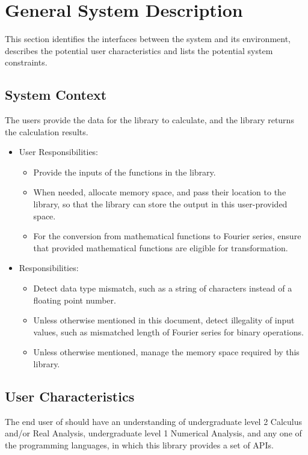 \documentclass[12pt]{article}
\begin{document}
\section{General System Description}

This section identifies the interfaces between the system and its environment,
describes the potential user characteristics and lists the potential system
constraints.


\subsection{System Context}

The users provide the data for the library to  calculate, and the library 
returns the calculation results.
\begin{itemize}
	\item User Responsibilities:
	\begin{itemize}
		\item Provide the inputs of the functions in the library.
		\item When needed, allocate memory space, and pass their location to the library, so that the library can store the output in this user-provided space.
		\item For the conversion from mathematical functions to Fourier series, 
		ensure that provided mathematical functions are eligible for transformation. 
	\end{itemize}
	\item \progname{} Responsibilities:
	\begin{itemize}
		\item Detect data type mismatch, such as a string of characters 
		instead of a floating point number.
		\item Unless otherwise mentioned in this document, detect illegality 
		of input values, such as mismatched length of Fourier series 
		for binary operations.
		\item Unless otherwise mentioned, manage the memory space 
		required by this library.
	\end{itemize}
\end{itemize}

\subsection{User Characteristics} \label{SecUserCharacteristics}

The end user of \progname{} should have an understanding of undergraduate 
level 2 Calculus and/or Real Analysis, undergraduate level 1 Numerical 
Analysis, and any one of the programming languages, in which this library 
provides a set of APIs.
\end{document}
